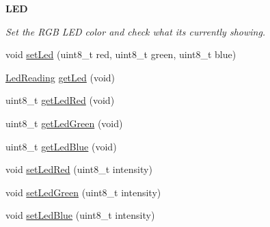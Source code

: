 \begin{Indent}{\bf L\+E\+D}\par
{\em Set the R\+G\+B L\+E\+D color and check what it\textquotesingle{}s currently showing. }\begin{DoxyCompactItemize}
\item 
void \hyperlink{class_bean_class_a7af1f9d1edb112f761db9b69686b5a5a}{set\+Led} (uint8\+\_\+t red, uint8\+\_\+t green, uint8\+\_\+t blue)
\item 
\hyperlink{struct_l_e_d___s_e_t_t_i_n_g___t}{Led\+Reading} \hyperlink{class_bean_class_ab73794fbf27d0297ead453ca60ac4aaf}{get\+Led} (void)
\item 
uint8\+\_\+t \hyperlink{class_bean_class_aea8736bf91c03de609233ddb270fb77d}{get\+Led\+Red} (void)
\item 
uint8\+\_\+t \hyperlink{class_bean_class_a5619292a562731e94f97e93432ab3639}{get\+Led\+Green} (void)
\item 
uint8\+\_\+t \hyperlink{class_bean_class_a8dcd68a87dc75dd0fe912483cc05fa43}{get\+Led\+Blue} (void)
\item 
void \hyperlink{class_bean_class_adfc2642320c53819c83bbaa59bbcef9b}{set\+Led\+Red} (uint8\+\_\+t intensity)
\item 
void \hyperlink{class_bean_class_ae1955c0312d1fa90bfeb847dada48c8c}{set\+Led\+Green} (uint8\+\_\+t intensity)
\item 
void \hyperlink{class_bean_class_ac09c0f3cea6025e2e12e8b6c5419434b}{set\+Led\+Blue} (uint8\+\_\+t intensity)
\end{DoxyCompactItemize}
\end{Indent}
